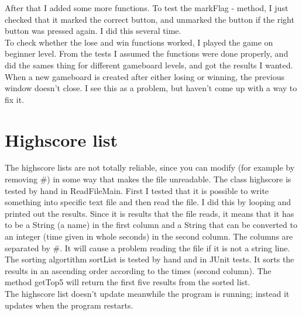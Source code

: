 \documentclass[12pt,twoside,a4paper]{article}
\begin{document}
After that I added some more functions. To test the markFlag - method, I just checked that it marked the correct button, and unmarked the button if the right button was pressed again. I did this several time. \\

To check whether the lose and win functions worked, I played the game on beginner level. From the tests I assumed the functions were done properly, and did the sames thing for different gameboard levels, and got the results I wanted. \\

When a new gameboard is created after either losing or winning, the previous window doesn't close. I see this as a problem, but haven't come up with a way to fix it. \\

\section*{Highscore list}

The highscore lists are not totally reliable, since you can modify (for example by removing \#) in some way that makes the file unreadable. The class highscore is tested by hand in ReadFileMain. First I tested that it is possible to write something into specific text file and then read the file. I did this by looping and printed out the results. Since it is results that the file reads, it means that it has to be a String (a name) in the first column and a String that can be converted to an integer (time given in whole seconds) in the second column. The columns are separated by \#. It will cause a problem reading the file if it is not a string line. The sorting algortithm sortList is tested by hand and in JUnit tests. It sorts the results in an ascending order according to the times (second column). The method getTop5 will return the first five results from the sorted list.  \\

The highscore list doesn't update meanwhile the program is running; instead it updates when the program restarts.
\end{document}
